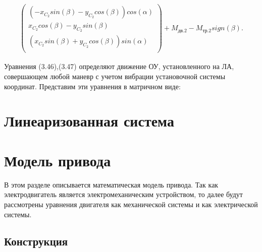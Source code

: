 \begin{equation}
\begin{multlined}
\left( \begin{array}{c}
	\left( -x_{C_{2}}sin \left(  \beta  \right) -y_{C_{2}}cos \left(  \beta  \right)  \right) cos \left(  \alpha  \right) \\
	x_{C_{2}}cos \left(  \beta  \right) -y_{C_{2}}sin \left(  \beta  \right) \\
	\left( x_{C_{2}}sin \left(  \beta  \right) +y_{C_{2}}cos \left(  \beta  \right)  \right) sin \left(  \alpha  \right) \\
\end{array}
\right) +M_{\textit{дв.2}}-M_{\textit{тр.2}}sign \left(  \beta  \right) .
\end{multlined}
\end{equation}

Уравнения (3.46),(3.47) определяют движение ОУ, установленного на ЛА, совершающем любой маневр с учетом вибрации установочной системы координат. Представим эти уравнения в матричном виде:


\section{Линеаризованная система} \label{ch:ch3/sect10}

\section{Модель привода} \label{ch:ch3/sect9}

В этом разделе описывается математическая модель привода. Так как электродвигатель является электромеханическим устройством, то далее будут рассмотрены уравнения двигателя как механической системы и как электрической системы.

\subsection{Конструкция} \label{sec:ch3/sec9/sub1}

